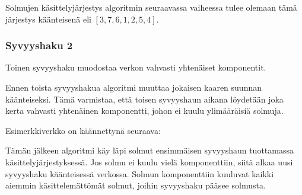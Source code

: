 Solmujen käsittelyjärjestys algoritmin seuraavassa vaiheessa
tulee olemaan tämä järjestys käänteisenä eli $[3,7,6,1,2,5,4]$.

\subsubsection{Syvyyshaku 2}

Toinen syvyyshaku muodostaa verkon vahvasti
yhtenäiset komponentit.

Ennen toista syvyyshakua algoritmi muuttaa
jokaisen kaaren suunnan käänteiseksi.
Tämä varmistaa,
että toisen syvyyshaun aikana löydetään
joka kerta vahvasti yhtenäinen komponentti,
johon ei kuulu ylimääräisiä solmuja.

Esimerkkiverkko on käännettynä seuraava:
\\
\begin{center}
\end{center}

Tämän jälkeen algoritmi käy läpi
solmut ensimmäisen syvyyshaun
tuottamassa käsittelyjärjestyksessä.
Jos solmu ei kuulu vielä komponenttiin,
siitä alkaa uusi syvyyshaku käänteisessä verkossa.
Solmun komponenttiin kuuluvat kaikki aiemmin
käsittelemättömät solmut,
joihin syvyyshaku pääsee solmusta.

